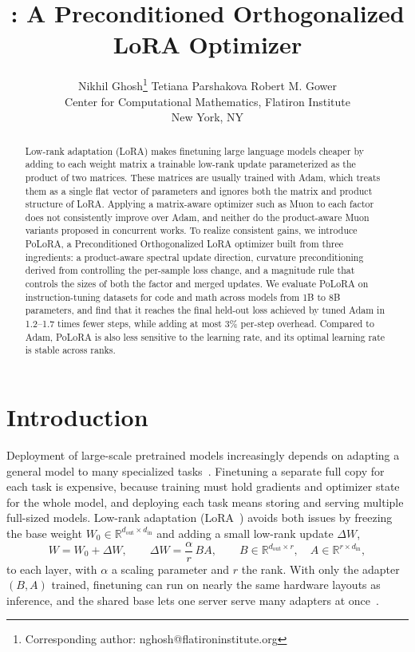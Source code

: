 \documentclass[11pt]{article}
\title{\methodname: A Preconditioned Orthogonalized LoRA Optimizer}
\author{
Nikhil Ghosh\footnote{Corresponding author: nghosh@flatironinstitute.org} \hspace{1cm}
Tetiana Parshakova \hspace{1cm}
Robert M. Gower\\[0.5em]
Center for Computational Mathematics, Flatiron Institute\\
New York, NY
}
\date{}
\newcommand{\R}{\mathbb{R}}
\newcommand{\DW}{\Delta W}
\theoremstyle{plain}
\theoremstyle{definition}
\theoremstyle{remark}
\theoremstyle{definition}
\begin{document}
\maketitle

\begin{abstract}
Low-rank adaptation (LoRA) makes finetuning large language models cheaper by adding to each weight matrix a trainable low-rank update parameterized as the product of two matrices. These matrices are usually trained with Adam, which treats them as a single flat vector of parameters and ignores both the matrix and product structure of LoRA. Applying a matrix-aware optimizer such as Muon to each factor does not consistently improve over Adam, and neither do the product-aware Muon variants proposed in concurrent works. To realize consistent gains, we introduce PoLoRA, a Preconditioned Orthogonalized LoRA optimizer built from three ingredients: a product-aware spectral update direction, curvature preconditioning derived from controlling the per-sample loss change, and a magnitude rule that controls the sizes of both the factor and merged updates. We evaluate PoLoRA on instruction-tuning datasets for code and math across models from 1B to 8B parameters, and find that it reaches the final held-out loss achieved by tuned Adam in 1.2--1.7 times fewer steps, while adding at most 3\% per-step overhead. Compared to Adam, PoLoRA is also less sensitive to the learning rate, and its optimal learning rate is stable across ranks.
\end{abstract}


\section{Introduction}
\label{sec:intro}

Deployment of large-scale pretrained models increasingly depends on adapting a
general model to many specialized tasks~\cite{foundation_models}. Finetuning a separate full copy for each task is expensive, because training must hold gradients and optimizer state for the whole model, and deploying each task means storing and serving multiple full-sized models. Low-rank adaptation (LoRA~\cite{lora}) avoids both issues by freezing the base weight $W_0 \in \R^{d_{\mathrm{out}} \times d_{\mathrm{in}}}$ and adding a small low-rank update $\Delta W$,
\begin{equation}
W = W_0 + \DW, \qquad \DW = \frac{\alpha}{r}\,BA, \qquad
B \in \mathbb{R}^{d_{\mathrm{out}} \times r}, \quad
A \in \mathbb{R}^{r \times d_{\mathrm{in}}},
\label{eq:lora}
\end{equation}
to each layer, with $\alpha$ a scaling parameter and $r$ the rank. With only the adapter $(B, A)$ trained, finetuning can run on nearly the same hardware layouts as inference, and the shared base lets one server serve many adapters at once~\cite{punica,bitdelta,schulman2025lora}.
\end{document}
